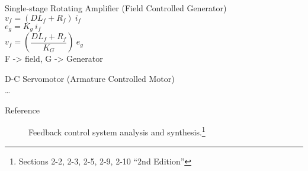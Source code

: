 Single-stage Rotating Amplifier (Field Controlled Generator)\\
$v_f=(DL_f+R_f)\ i_f$\\
$e_g=K_g\ i_f$\\

$v_f=(\dfrac{DL_f+R_f}{K_G})\ e_g$\\

F -> field, G -> Generator

D-C Servomotor (Armature Controlled Motor)\\

\ldots


\begin{description}
\item[Reference] Feedback control system analysis and synthesis.\footnote{Sections 2-2, 2-3, 2-5, 2-9, 2-10 ``2nd Edition''}
			\\
\end{description}